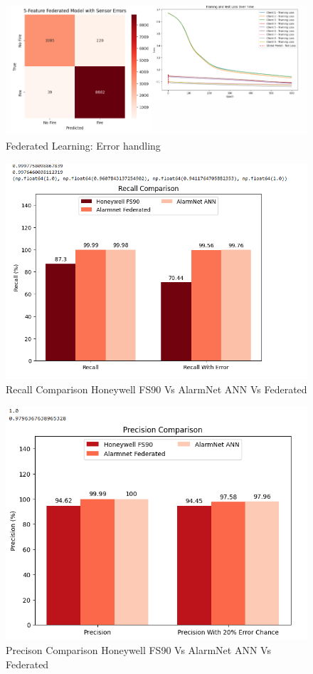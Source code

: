 \documentclass[conference]{IEEEtran}
\begin{document}
\begin{figure}[htbp]
    \centering
    \includegraphics[width=1\linewidth]{images/FedHandling.png}
    \caption{Federated Learning: Error handling}
    \label{fig:federr}
\end{figure}

\begin{figure}[htbp]
    \centering
    \includegraphics[width=0.75\linewidth]{images/Recall.png}
    \caption{Recall Comparison Honeywell FS90 Vs AlarmNet ANN Vs Federated}
    \label{fig:comprecall}
\end{figure}

\begin{figure}[htbp]
    \centering
    \includegraphics[width=0.75\linewidth]{images/PrecisionComparison.png}
    \caption{Precison Comparison Honeywell FS90 Vs AlarmNet ANN Vs Federated}
    \label{fig:compprec}
\end{figure}
\end{document}
